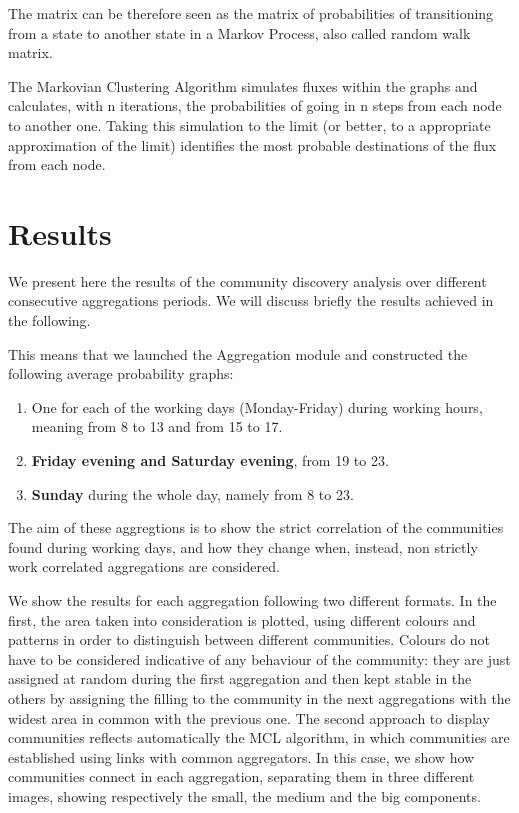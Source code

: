 \documentclass[12pt,a4paper]{article}
\begin{document}
The matrix can be therefore seen as the matrix of probabilities
of transitioning from a state to another state in
a Markov Process, also called random walk matrix.

The Markovian Clustering Algorithm simulates fluxes within the
graphs and calculates, with n iterations, the probabilities of going in
n steps from each node to another one. Taking this simulation to the limit
(or better, to a appropriate approximation of the limit) identifies
the most probable destinations of the flux from each node.



\newpage

\section{Results}
\label{results}

We present here the results of the community discovery analysis
over different consecutive aggregations periods. We will discuss briefly the results
achieved in the following.

This means that we launched the Aggregation module and constructed 
the following average probability graphs:
\begin{enumerate}
\item One for each of the working days (Monday-Friday) during working hours, meaning from 8 to 13 and from 15 to 17.
\item \textbf{Friday evening and Saturday evening}, from 19 to 23.
\item \textbf{Sunday} during the whole day, namely from 8 to 23.
\end{enumerate}
The aim of these aggregtions is to show the strict correlation of the communities found during working days, and how they change when, instead,
non strictly work correlated aggregations are considered. 

We show the results for each aggregation following two different formats.
In the first, the area taken into consideration is plotted, using different colours and patterns in order to distinguish between different communities. Colours do not have to be considered indicative of any behaviour of the community: they are just assigned at random during the first aggregation and then kept stable in the others by assigning the filling to the community in the next aggregations with the widest area in common with the previous one.
The second approach to display communities reflects automatically the MCL algorithm, in which communities are established using links with common aggregators. In this case, we show how communities connect in each aggregation, separating them in three different images, showing
respectively the small, the medium and the big components.
\end{document}
